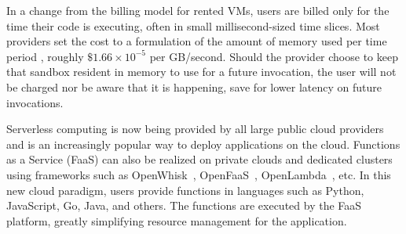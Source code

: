 In a change from the billing model for rented VMs, users are billed only for the time their code is executing, often in small millisecond-sized time slices.
Most providers set the cost to a formulation of the amount of memory used per time period \cite{lambda-pricing}, roughly $\$1.66 \times 10^{-5}$ per GB/second.
Should the provider choose to keep that sandbox resident in memory to use for a future invocation, the user will not be charged nor be aware that it is happening, save for lower latency on future invocations.



Serverless computing is now being provided by all large public cloud providers and is an increasingly popular way to deploy applications on the cloud.  
Functions as a Service (FaaS) can also be realized on private clouds and dedicated clusters using frameworks such as OpenWhisk~\cite{openwhisk}, OpenFaaS~\cite{openfaas},  OpenLambda~\cite{hendrickson2016serverless}, etc. 
In this new cloud paradigm, users provide functions in languages such as Python, JavaScript, Go, Java, and others. 
The functions are executed by the FaaS platform, greatly simplifying resource management for the application. 





